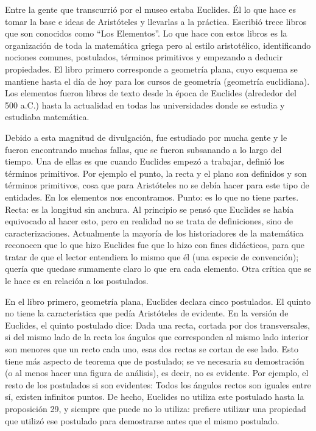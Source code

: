 Entre la gente que transcurrió por el museo estaba Euclides. Él lo que hace es tomar la base e ideas de Aristóteles y llevarlas a la práctica. Escribió trece libros que son conocidos como “Los Elementos”. Lo que hace con estos libros es la organización de toda la matemática griega pero al estilo aristotélico, identificando nociones comunes, postulados, términos primitivos y empezando a deducir propiedades. El libro primero corresponde a geometría plana, cuyo esquema se mantiene hasta el día de hoy para los cursos de geometría (geometría euclidiana). Los elementos fueron libros de texto desde la época de Euclides (alrededor del 500 a.C.) hasta la actualidad en todas las universidades donde se estudia y estudiaba matemática. 

Debido a esta magnitud de divulgación, fue estudiado por mucha gente y le fueron encontrando muchas fallas, que se fueron subsanando a lo largo del tiempo. Una de ellas es que cuando Euclides empezó a trabajar, definió los términos primitivos. Por ejemplo el punto, la recta y el plano son definidos y son términos primitivos, cosa que para Aristóteles no se debía hacer para este tipo de entidades. En los elementos nos encontramos. Punto: es lo que no tiene partes. Recta: es la longitud sin anchura. Al principio se pensó que Euclides se había equivocado al hacer esto, pero en realidad no se trata de definiciones, sino de caracterizaciones. Actualmente la mayoría de los historiadores de la matemática reconocen que lo que hizo Euclides fue que lo hizo con fines didácticos, para que tratar de que el lector entendiera lo mismo que él (una especie de convención); quería que quedase sumamente claro lo que era cada elemento. Otra crítica que se le hace es en relación a los postulados. 

En el libro primero, geometría plana, Euclides declara cinco postulados. El quinto no tiene la característica que pedía Aristóteles de evidente. En la versión de Euclides, el quinto postulado dice: Dada una recta, cortada por dos transversales, si del mismo lado de la recta los ángulos que corresponden al mismo lado interior son menores que un recto cada uno, esas dos rectas se cortan de ese lado. Esto tiene más aspecto de teorema que de postulado; se ve necesaria su demostración (o al menos hacer una figura de análisis), es decir, no es evidente. Por ejemplo, el resto de los postulados si son evidentes: Todos los ángulos rectos son iguales entre sí, existen infinitos puntos. De hecho, Euclides no utiliza este postulado hasta la proposición 29, y siempre que puede no lo utiliza: prefiere utilizar una propiedad que utilizó ese postulado para demostrarse antes que el mismo postulado. 

